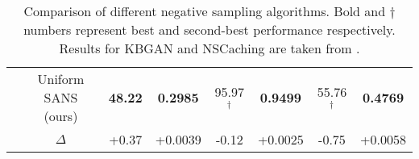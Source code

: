 \begin{table*}[h]
\begin{small}
\begin{tabular}{cccccccc}
& Uniform SANS (ours) & \textbf{48.22 }& \textbf{0.2985} & 95.97$^\dagger$ & \textbf{0.9499} & 55.76$^\dagger$ & \textbf{0.4769} \\
& $\Delta$ & \cellcolor{celadon}+0.37 & \cellcolor{celadon}+0.0039 & \cellcolor{mistyrose}-0.12 & \cellcolor{celadon}+0.0025 & \cellcolor{mistyrose}-0.75 & \cellcolor{celadon}+0.0058\\
\hline
\end{tabular}
\caption{Comparison of different negative sampling algorithms. Bold and $\dagger$ numbers represent best and second-best performance respectively. Results for KBGAN and NSCaching are taken from \cite{zhang2019nscaching}.
}
\label{tab:unisota_comp}
\end{small}
\end{table*}
